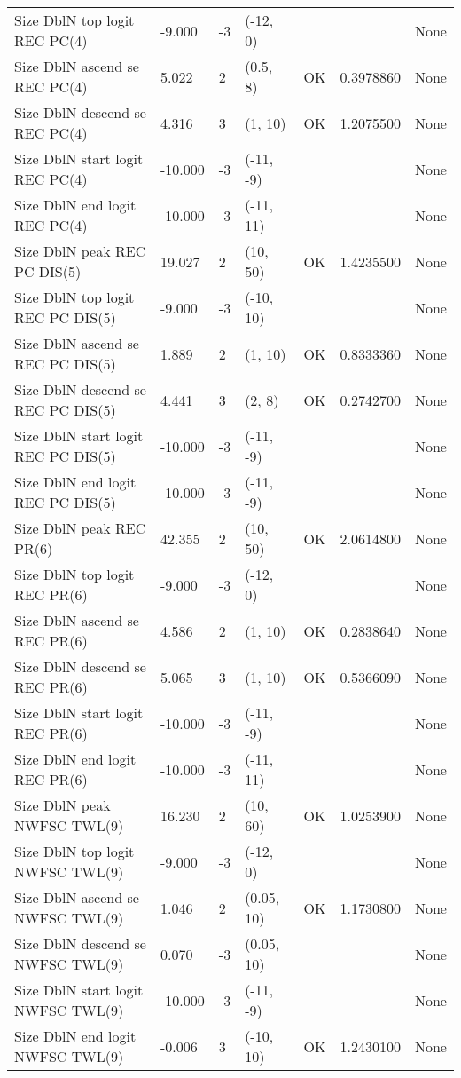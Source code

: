 \documentclass[11pt,
  english,
  a4paper,
]{article}
\begin{document}
\begin{landscape}
\begin{longtable}[t]{>{\raggedright\arraybackslash}p{8.5cm}lllll>{\raggedright\arraybackslash}p{4cm}}
Size DblN top logit REC PC(4) & -9.000 & -3 & (-12, 0) &  &  & None\\
Size DblN ascend se REC PC(4) & 5.022 & 2 & (0.5, 8) & OK & 0.3978860 & None\\
Size DblN descend se REC PC(4) & 4.316 & 3 & (1, 10) & OK & 1.2075500 & None\\
Size DblN start logit REC PC(4) & -10.000 & -3 & (-11, -9) &  &  & None\\
Size DblN end logit REC PC(4) & -10.000 & -3 & (-11, 11) &  &  & None\\
Size DblN peak REC PC DIS(5) & 19.027 & 2 & (10, 50) & OK & 1.4235500 & None\\
Size DblN top logit REC PC DIS(5) & -9.000 & -3 & (-10, 10) &  &  & None\\
Size DblN ascend se REC PC DIS(5) & 1.889 & 2 & (1, 10) & OK & 0.8333360 & None\\
Size DblN descend se REC PC DIS(5) & 4.441 & 3 & (2, 8) & OK & 0.2742700 & None\\
Size DblN start logit REC PC DIS(5) & -10.000 & -3 & (-11, -9) &  &  & None\\
Size DblN end logit REC PC DIS(5) & -10.000 & -3 & (-11, -9) &  &  & None\\
Size DblN peak REC PR(6) & 42.355 & 2 & (10, 50) & OK & 2.0614800 & None\\
Size DblN top logit REC PR(6) & -9.000 & -3 & (-12, 0) &  &  & None\\
Size DblN ascend se REC PR(6) & 4.586 & 2 & (1, 10) & OK & 0.2838640 & None\\
Size DblN descend se REC PR(6) & 5.065 & 3 & (1, 10) & OK & 0.5366090 & None\\
Size DblN start logit REC PR(6) & -10.000 & -3 & (-11, -9) &  &  & None\\
Size DblN end logit REC PR(6) & -10.000 & -3 & (-11, 11) &  &  & None\\
Size DblN peak NWFSC TWL(9) & 16.230 & 2 & (10, 60) & OK & 1.0253900 & None\\
Size DblN top logit NWFSC TWL(9) & -9.000 & -3 & (-12, 0) &  &  & None\\
Size DblN ascend se NWFSC TWL(9) & 1.046 & 2 & (0.05, 10) & OK & 1.1730800 & None\\
Size DblN descend se NWFSC TWL(9) & 0.070 & -3 & (0.05, 10) &  &  & None\\
Size DblN start logit NWFSC TWL(9) & -10.000 & -3 & (-11, -9) &  &  & None\\
Size DblN end logit NWFSC TWL(9) & -0.006 & 3 & (-10, 10) & OK & 1.2430100 & None\\

\end{longtable}
\end{landscape}
\end{document}

